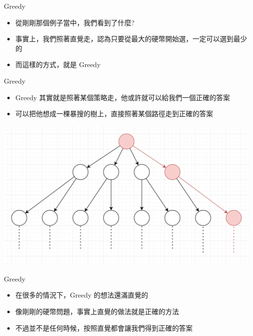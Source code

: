 \documentclass[aspectratio=169]{beamer}
\begin{document}
    \begin{frame}{Greedy}
        \begin{itemize}
            \item 從剛剛那個例子當中，我們看到了什麼?
            \item<2-> 事實上，我們照著直覺走，認為只要從最大的硬幣開始選，一定可以選到最少的
            \item<2-> 而這樣的方式，就是 Greedy
        \end{itemize}
    \end{frame}
    
    \begin{frame}{Greedy}
        \begin{itemize}
            \item Greedy 其實就是照著某個策略走，他或許就可以給我們一個正確的答案
            \item 可以把他想成一棵暴搜的樹上，直接照著某個路徑走到正確的答案
        \end{itemize}
        \begin{center}
            \includegraphics[scale=0.35]{images/greedy_tree.png}
        \end{center}
    \end{frame}
    
    \begin{frame}{Greedy}
        \begin{itemize}
            \item 在很多的情況下，Greedy 的想法還滿直覺的
            \item 像剛剛的硬幣問題，事實上直覺的做法就是正確的方法
            \item 不過並不是任何時候，按照直覺都會讓我們得到正確的答案
        \end{itemize}
    \end{frame}
    
\end{document}
